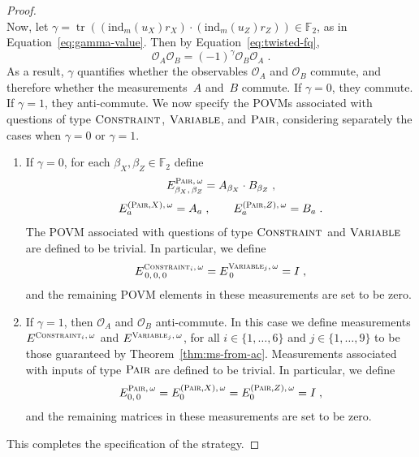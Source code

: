 \documentclass[11pt]{article}
\theoremstyle{definition}
\newcommand{\F}{\ensuremath{\mathbb{F}}}
\newcommand{\ind}{\ensuremath{\mathrm{ind}}}
\DeclareMathOperator{\tr}{tr}
\newcommand{\typestyle}[1]{\ensuremath{\textsc{#1}}\xspace}
\newcommand{\Pair}{\typestyle{Pair}}
\newcommand{\Constraint}{\typestyle{Constraint}}
\newcommand{\Variable}{\typestyle{Variable}}
\begin{document}
\begin{proof}
\begin{equation*}
  \end{equation*}
  Now, let $\gamma = \tr((\ind_{m}(u_X)r_X) \cdot (\ind_{m}(u_Z)r_Z)) \in \F_2$,
  as in Equation~\eqref{eq:gamma-value}.
  Then by Equation~\eqref{eq:twisted-fq},
  \begin{equation*}
  \mathcal{O}_A \mathcal{O}_B = (-1)^{\gamma} \mathcal{O}_B \mathcal{O}_A\;.
  \end{equation*}
  As a result, $\gamma$ quantifies whether the observables $\mathcal{O}_A$ and
  $\mathcal{O}_B$ commute, and therefore whether the measurements~$A$ and~$B$
  commute.
  If $\gamma = 0$, they commute.
  If $\gamma = 1$, they anti-commute.
  We now specify the POVMs associated with questions of type $\Constraint$,
  $\Variable$, and $\Pair$, considering separately the cases when $\gamma = 0$
  or $\gamma = 1$.
  \begin{enumerate}
  \item If $\gamma = 0$, 
     for each $\beta_X, \beta_Z \in \F_2$ define
    \begin{equation}\label{eq:pair-definition}
      E^{\Pair,\, \omega}_{\beta_X,\, \beta_Z} = A_{\beta_X} \cdot B_{\beta_Z}\;,
    \end{equation}
    \begin{equation*}
      E^{(\Pair,X),\, \omega}_{a} = A_{a} \;,\qquad
      E^{(\Pair,Z),\, \omega}_{a} = B_{a}\;.
    \end{equation*}
    The POVM associated with questions of type $\Constraint$ and $\Variable$ are
    defined to be trivial.
    In particular, we define
    \begin{equation*}
      E^{\Constraint_i,\, \omega}_{\, 0,\, 0,\, 0}
      = E^{\Variable_j,\, \omega}_{\, 0} = I\;,
    \end{equation*}
    and the remaining POVM elements in these measurements are set to be zero.
  \item If $\gamma = 1$, then $\mathcal{O}_A$ and $\mathcal{O}_B$ anti-commute.
    In this case we define measurements $E^{\Constraint_i,\, \omega}$ and
    $E^{\Variable_j,\, \omega}$, for all $i\in\{1,\ldots,6\}$ and $j
    \in\{1,\ldots,9\}$ to be those guaranteed by Theorem~\ref{thm:ms-from-ac}.
    Measurements associated with inputs of type $\Pair$ are defined to be
    trivial.
    In particular, we define
    \begin{equation*}
      E^{\Pair,\, \omega}_{0,\, 0} = E^{(\Pair,X),\, \omega}_{0} = E^{(\Pair,Z),\, \omega}_{0} = I\;,
    \end{equation*}
    and the remaining matrices in these measurements are set to be zero.
  \end{enumerate}
  This completes the specification of the strategy.


\end{proof}
\end{document}
